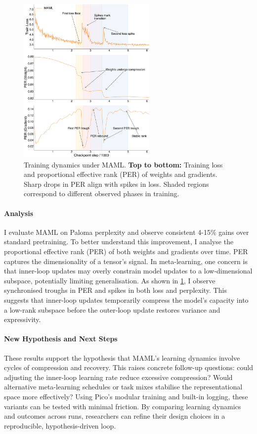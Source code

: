 \begin{figure}[h!]
    \centering
    \includegraphics[width=0.6\textwidth]{chapters/pico/figures/maml-example.pdf}
    \caption{Training dynamics under MAML.
    \textbf{Top to bottom:} Training loss and proportional effective rank (PER) of weights and gradients.
    Sharp drops in PER align with spikes in loss. Shaded regions correspond to different observed phases in training. 
    }
    \label{fig:maml_example}
\end{figure}


\paragraph{Analysis} I evaluate MAML on Paloma perplexity and observe consistent 4-15\% gains over standard pretraining. To better understand this improvement, I analyse the proportional effective rank (PER) \citep{diehlmartinez2024tending} of both weights and gradients over time. PER captures the dimensionality of a tensor's signal. In meta-learning, one concern is that inner-loop updates may overly constrain model updates to a low-dimensional subspace, potentially limiting generalisation. As shown in \cref{fig:maml_example}, I observe synchronised troughs in PER and spikes in both loss and perplexity. This suggests that inner-loop updates temporarily compress the model's capacity into a low-rank subspace before the outer-loop update restores variance and expressivity.


\paragraph{New Hypothesis and Next Steps}
These results support the hypothesis that MAML's learning dynamics involve cycles of compression and recovery. This raises concrete follow-up questions: could adjusting the inner-loop learning rate reduce excessive compression? Would alternative meta-learning schedules or task mixes stabilise the representational space more effectively? Using Pico's modular training and built-in logging, these variants can be tested with minimal friction. By comparing learning dynamics and outcomes across runs, researchers can refine their design choices in a reproducible, hypothesis-driven loop.%

